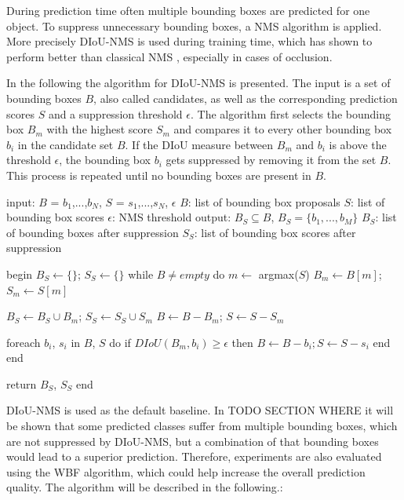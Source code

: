 During prediction time often multiple bounding boxes are predicted for one object.
To suppress unnecessary bounding boxes, a \ac{NMS} algorithm is applied.
More precisely \ac{DIoU}-\ac{NMS} \cite{diou} is used during training time, which has shown to perform better than classical \ac{NMS} \cite{soft_nms}, especially in cases of occlusion.

In the following the algorithm for \ac{DIoU}-\ac{NMS} is presented.
The input is a set of bounding boxes $B$, also called candidates, as well as the corresponding prediction scores $S$ and a suppression threshold $\epsilon$.
The algorithm first selects the bounding box $B_m$ with the highest score $S_m$ and compares it to every other bounding box $b_i$ in the candidate set $B$.
If the \ac{DIoU} measure between $B_m$ and $b_i$ is above the threshold $\epsilon$, the bounding box $b_i$ gets suppressed by removing it from the set $B$.
This process is repeated until no bounding boxes are present in $B$.

\begin{algorithm}[caption={DIoU-NMS Algorithm TODO caption to bottom and format}, label={alg1}]
input:  $B$ = {$b_1$,...,$b_N$}, $S$ = {$s_1$,...,$s_N$}, $\epsilon$
        $B$: list of bounding box proposals
        $S$: list of bounding box scores
        $\epsilon$: NMS threshold
output: $B_S \subseteq B$, $B_S = \{b_1,...,b_M\}$
        $B_S$: list of bounding boxes after suppression
        $S_S$: list of bounding box scores after suppression

begin
$B_S \gets \{\}$; $S_S \gets \{\}$
while $B \neq empty$ do
    $m \gets$ argmax($S$)
    $B_m \gets B[m]$; $S_m \gets S[m]$

    $B_S \gets B_S \cup B_m$; $S_S \gets S_S \cup S_m$
    $B \gets B - B_m$; $S \gets S - S_m$

    foreach $b_i$, $s_i$ in $B$, $S$ do
        if $DIoU(B_m, b_i) \geq \epsilon$ then
            $B \gets B - b_i; S \gets S - s_i$
        end
    end

    return $B_S$, $S_S$
end
\end{algorithm}

DIoU-NMS is used as the default baseline. In TODO SECTION WHERE it will be shown that some predicted classes suffer from multiple bounding boxes, which are not suppressed by DIoU-NMS, but a combination of that bounding boxes would lead to a superior prediction.
Therefore, experiments are also evaluated using the \ac{WBF} \cite{weighted_bbox_fusion} algorithm, which could help increase the overall prediction quality. The algorithm will be described in the following.:

